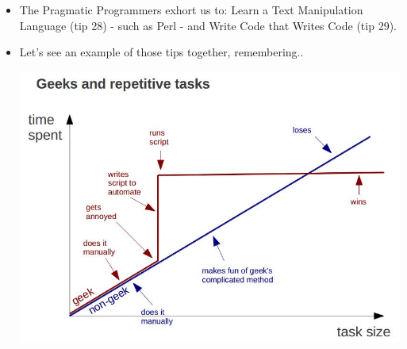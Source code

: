 \documentclass[handout,]{beamer}
\newcommand{\pitem}{\pause \item}
\begin{document}
\begin{frame}[fragile]
    \begin{itemize}
    \item
    The \alert{Pragmatic Programmers} exhort us to:
      \alert{Learn a Text Manipulation Language (tip 28)} - such as \alert{Perl} - and
      \alert{Write Code that Writes Code (tip 29)}.


    \pitem
    Let's see an example of those tips together, remembering..

\centering
\vspace{10pt}
\includegraphics[height=0.7\textheight]{Geeks.jpg}

    \end{itemize}
\end{frame}
\end{document}
